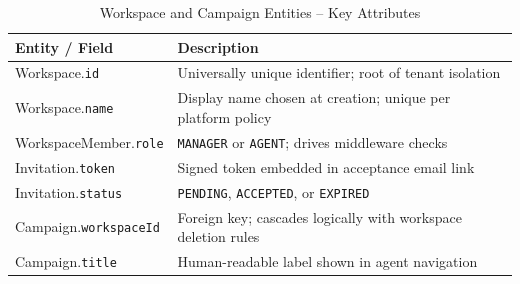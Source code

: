 \documentclass[12pt,a4paper]{report}
\newcommand{\reporttablesetup}{%
  \small%
  \setlength{\tabcolsep}{5pt}%
  \renewcommand{\arraystretch}{1.38}%
  \arrayrulecolor{framegray}%
}
\begin{document}
\begin{table}[H]
  \centering
  \reporttablesetup
  \footnotesize
  \begin{tabularx}{\textwidth}{|p{5.5cm}|Y|}
    \hline
    \textbf{Entity / Field} & \textbf{Description} \\
    \hline
    Workspace.\allowbreak\texttt{id} & Universally unique identifier; root of tenant isolation \\
    \hline
    Workspace.\allowbreak\texttt{name} & Display name chosen at creation; unique per platform policy \\
    \hline
    WorkspaceMember.\allowbreak\texttt{role} & \texttt{MANAGER} or \texttt{AGENT}; drives middleware checks \\
    \hline
    Invitation.\allowbreak\texttt{token} & Signed token embedded in acceptance email link \\
    \hline
    Invitation.\allowbreak\texttt{status} & \texttt{PENDING}, \texttt{ACCEPTED}, or \texttt{EXPIRED} \\
    \hline
    Campaign.\allowbreak\texttt{workspaceId} & Foreign key; cascades logically with workspace deletion rules \\
    \hline
    Campaign.\allowbreak\texttt{title} & Human-readable label shown in agent navigation \\
    \hline
  \end{tabularx}
  \caption{Workspace and Campaign Entities -- Key Attributes}
  \label{tab:entity-workspace}
\end{table}
\end{document}
